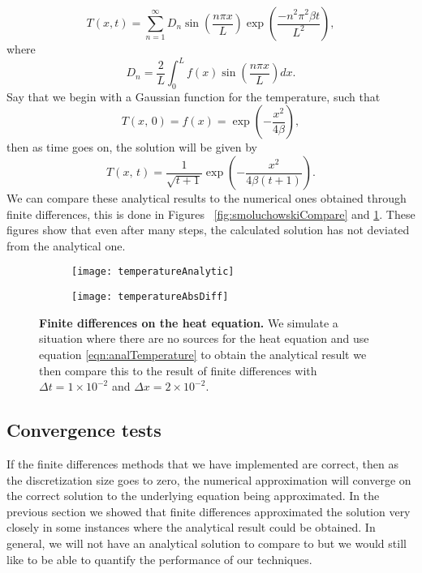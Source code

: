 \begin{equation}
T(x, t) = \sum_{n=1}^\infty D_n \sin \left(\frac{n \pi x}{L} \right) \exp\left(\frac{-n^2 \pi^2 \beta t}{L^2}\right), \label{eqn:analTemperature}
\end{equation}
where
\begin{equation}
D_n = \frac{2}{L} \int_0^L f(x) \sin \left(\frac{n \pi x}{L} \right) dx.
\end{equation}
Say that we begin with a Gaussian function for the temperature, such that
\begin{equation}
T(x, \, 0) = f(x) =  \exp{\left (-\frac{x^2}{4 \beta} \right)},
\end{equation}
then as time goes on, the solution will be given by
\begin{equation}
T(x, \, t) = \frac{1}{\sqrt{t + 1}} \exp{ \left(-\frac{x^2}{4 \beta (t + 1)} \right)}.
\end{equation}
We can compare these analytical results to the numerical ones obtained through finite differences, this is done in Figures ~\ref{fig:smoluchowskiCompare} and \ref{fig:temperatureCompare}. These figures show that even after many steps, the calculated solution has not deviated from the analytical one.

\begin{figure}
	\center
	\begin{subfigure}{0.45\textwidth}
	\texttt{[image: temperatureAnalytic]}
	\end{subfigure}
	\begin{subfigure}{0.45\textwidth}
	\texttt{[image: temperatureAbsDiff]}
	\end{subfigure}
	\caption{\textbf{Finite differences on the heat equation.} We simulate a situation where there are no sources for the heat equation and use equation \ref{eqn:analTemperature} to obtain the analytical result we then compare this to the result of finite differences with $\Delta t = 1 \times 10^{-2}$ and $\Delta x = 2 \times 10^{-2}$. \label{fig:temperatureCompare}}
\end{figure}

\subsection{Convergence tests}
If the finite differences methods that we have implemented are correct, then as the discretization size goes to zero, the numerical approximation will converge on the correct solution to the underlying equation being approximated. In the previous section we showed that finite differences approximated the solution very closely in some instances where the analytical result could be obtained. In general, we will not have an analytical solution to compare to but we would still like to be able to quantify the performance of our techniques.

